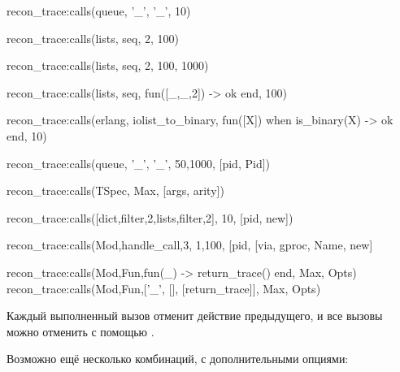 \begin{VerbatimErl}
recon_trace:calls({queue, '_', '_'}, 10)

recon_trace:calls({lists, seq, 2}, 100)

recon_trace:calls({lists, seq, 2}, {100, 1000})

recon_trace:calls({lists, seq, fun([_,_,2]) -> ok end}, 100)

recon_trace:calls({erlang, iolist_to_binary,
                   fun([X]) when is_binary(X) -> ok end},
                  10)

recon_trace:calls({queue, '_', '_'}, {50,1000}, [{pid, Pid}])

recon_trace:calls(TSpec, Max, [{args, arity}])

recon_trace:calls([{dict,filter,2},{lists,filter,2}], 10, [{pid, new}])

recon_trace:calls({Mod,handle_call,3}, {1,100}, [{pid, [{via, gproc, Name}, new]}

recon_trace:calls({Mod,Fun,fun(_) -> return_trace() end}, Max, Opts)
recon_trace:calls({Mod,Fun,[{'_', [], [{return_trace}]}]}, Max, Opts)

\end{VerbatimErl}

Каждый выполненный вызов отменит действие предыдущего, и все вызовы можно отменить с помощью .

Возможно ещё несколько комбинаций, с дополнительными опциями:


